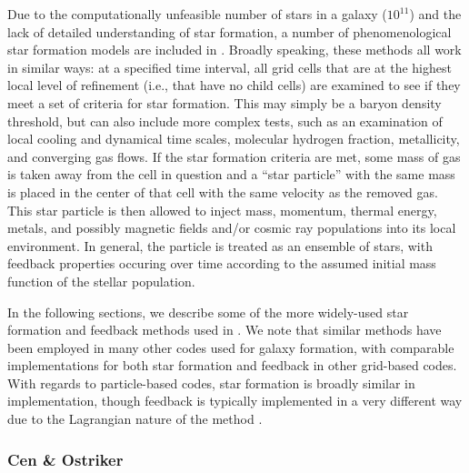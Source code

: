 Due to the computationally unfeasible number of stars in a galaxy
($10^{11}$) and the lack of detailed understanding of star formation, a
number of phenomenological star formation models are included in
\enzo.
Broadly speaking, these methods all work in similar
ways: at a specified time interval, all grid cells that are at the
highest local level of refinement (i.e., that have no child cells) are
examined to see if they meet a set of criteria for star formation.
This may simply be a baryon density threshold, but can also include more
complex tests, such as an examination of local cooling and dynamical
time scales, molecular hydrogen fraction, metallicity, and converging
gas flows.  If the star formation criteria are met, some mass of gas
is taken away from the cell in question and a ``star particle'' with
the same mass is placed in the center of that cell with the same
velocity as the removed gas.  This star particle is then
allowed to inject mass, momentum, thermal energy, metals, and possibly
magnetic fields and/or cosmic ray populations into its local
environment.  In general, the particle is treated as an ensemble of
stars, with feedback properties occuring over time according to the
assumed initial mass function of the stellar population.

In the following sections, we describe some of the more widely-used
star formation and feedback methods used in \enzo.  We note that
similar methods have been employed in many other codes used for galaxy
formation, with comparable implementations for both star formation and
feedback in other grid-based codes.  With regards to particle-based
codes, star formation is broadly similar in implementation, though
feedback is typically implemented in a very different way due to the
Lagrangian nature of the method \citep[see,
e.g.,][]{sh03a,sh03b,hs03}.

\subsubsection{Cen \& Ostriker}
\label{sec:starform_cen}


